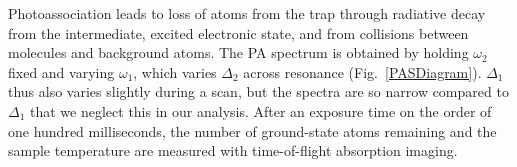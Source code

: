 Photoassociation leads to loss of atoms from the trap through radiative decay from the intermediate, excited electronic state, and from collisions between molecules and background atoms. The PA spectrum is obtained by holding $\omega_2$ fixed and varying $\omega_1$, which varies $\Delta_2$ across resonance (Fig.\ \ref{PASDiagram}). $\Delta_1$ thus also varies slightly during a scan, but the spectra are so narrow compared to $\Delta_1$ that we neglect this in our analysis. After an exposure time on the order of one hundred milliseconds, the number of ground-state atoms remaining and the sample temperature are measured with time-of-flight absorption imaging.












